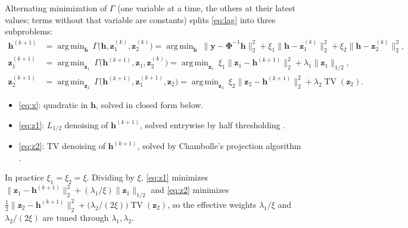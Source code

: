 \documentclass[11pt,a4paper]{article}
\DeclareMathOperator*{\argmin}{arg\,min}
\DeclareMathOperator{\TV}{TV}
\newcommand{\x}{\mathbf h}
\newcommand{\y}{\mathbf y}
\newcommand{\zo}{\mathbf z_1}
\newcommand{\zt}{\mathbf z_2}
\newcommand{\bPhi}{\boldsymbol\Phi}
\begin{document}
Alternating minimization of $\Gamma$ (one variable at a time, the others at their latest values; terms without that variable are constants)
splits \eqref{eq:lag} into three subproblems:
\begin{align}
  \x^{(k+1)}
  &= \argmin_{\x}\ \Gamma\bigl(\x, \zo^{(k)}, \zt^{(k)}\bigr)
   = \argmin_{\x}\ \bigl\lVert \y - \bPhi^{-1}\x \bigr\rVert_2^2
     + \xi_1 \bigl\lVert \x - \zo^{(k)} \bigr\rVert_2^2 + \xi_2 \bigl\lVert \x - \zt^{(k)} \bigr\rVert_2^2 , \label{eq:x} \\
  \zo^{(k+1)}
  &= \argmin_{\zo}\ \Gamma\bigl(\x^{(k+1)}, \zo, \zt^{(k)}\bigr)
   = \argmin_{\zo}\ \xi_1 \bigl\lVert \zo - \x^{(k+1)} \bigr\rVert_2^2 + \lambda_1 \lVert \zo \rVert_{1/2} , \label{eq:z1} \\
  \zt^{(k+1)}
  &= \argmin_{\zt}\ \Gamma\bigl(\x^{(k+1)}, \zo^{(k+1)}, \zt\bigr)
   = \argmin_{\zt}\ \xi_2 \bigl\lVert \zt - \x^{(k+1)} \bigr\rVert_2^2 + \lambda_2 \TV(\zt) . \label{eq:z2}
\end{align}
\begin{itemize}
  \item \eqref{eq:x}: quadratic in $\x$, solved in closed form below.
  \item \eqref{eq:z1}: $L_{1/2}$ denoising of $\x^{(k+1)}$, solved entrywise by half thresholding \cite{xu2012}.
  \item \eqref{eq:z2}: TV denoising of $\x^{(k+1)}$, solved by Chambolle's projection algorithm \cite{chambolle2004}.
\end{itemize}
In practice $\xi_1 = \xi_2 = \xi$. Dividing by $\xi$, \eqref{eq:z1} minimizes
$\lVert \zo - \x^{(k+1)} \rVert_2^2 + (\lambda_1/\xi) \lVert \zo \rVert_{1/2}$ and \eqref{eq:z2} minimizes
$\tfrac12 \lVert \zt - \x^{(k+1)} \rVert_2^2 + \bigl(\lambda_2/(2\xi)\bigr) \TV(\zt)$,
so the effective weights $\lambda_1/\xi$ and $\lambda_2/(2\xi)$ are tuned through $\lambda_1, \lambda_2$.

\newpage
\end{document}
